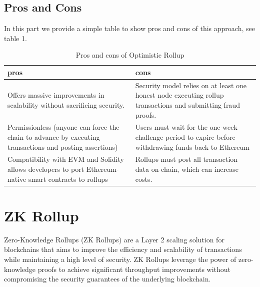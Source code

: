 \documentclass{report}
\begin{document}
\subsection{Pros and Cons}
In this part we provide a simple table to show pros and cons of this approach, see table 1.
\begin{table}[htbp]
	\centering
	\captionsetup{justification=centering}
	\caption[position=above]{Pros and cons of Optimistic Rollup}
	\begin{tabular}{|>{\centering\arraybackslash}p{8cm}|>{\centering\arraybackslash}p{8cm}|}
		\hline
		\textbf{pros} & \textbf{cons}\\
		\hline
		Offers massive improvements in scalability without sacrificing security.
		 & Security model relies on at least one honest node executing rollup transactions and submitting fraud proofs.\\
		\hline
		Permissionless (anyone can force the chain to advance by executing transactions and posting assertions) & Users must wait for the one-week challenge period to expire before withdrawing funds back to Ethereum \\
		\hline
		Compatibility with EVM and Solidity allows developers to port Ethereum-native smart contracts to rollups & Rollups must post all transaction data on-chain, which can increase costs. \\
		\hline
	\end{tabular}
\end{table}
\section{ZK Rollup}
Zero-Knowledge Rollups (ZK Rollups) are a Layer 2 scaling solution for blockchains that aims to improve the efficiency and scalability of transactions while maintaining a high level of security. ZK Rollups leverage the power of zero-knowledge proofs to achieve significant throughput improvements without compromising the security guarantees of the underlying blockchain.
\end{document}
